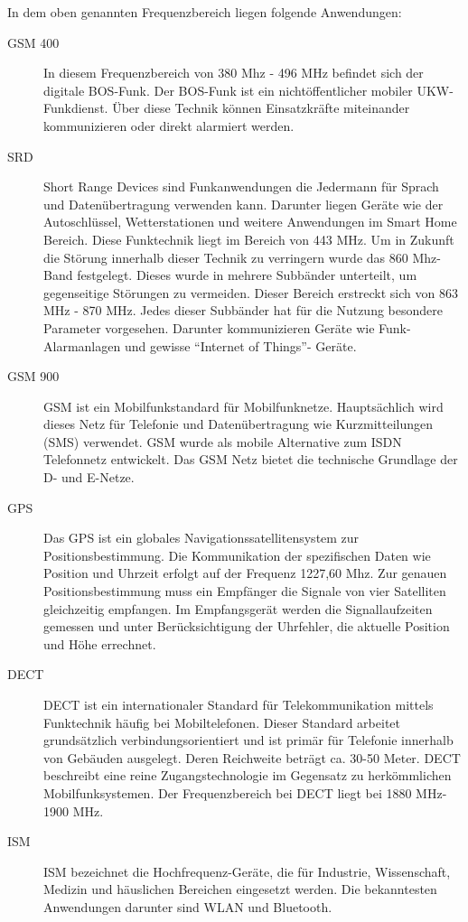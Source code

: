 In dem oben genannten Frequenzbereich liegen folgende Anwendungen:

\begin{description}
	\item [GSM 400]{In diesem Frequenzbereich von 380 Mhz - 496 MHz befindet sich der digitale \ac{BOS}-Funk. Der BOS-Funk ist ein nichtöffentlicher mobiler \ac{UKW}-Funkdienst. Über diese Technik können Einsatzkräfte miteinander kommunizieren oder direkt alarmiert werden.}
	\item [\ac{SRD}] {Short Range Devices sind Funkanwendungen die Jedermann für Sprach und Datenübertragung verwenden kann. Darunter liegen Geräte wie der Autoschlüssel, Wetterstationen und weitere Anwendungen im Smart Home Bereich. Diese Funktechnik liegt im Bereich von 443 MHz. Um in Zukunft die Störung innerhalb dieser Technik zu verringern  wurde das 860 Mhz-Band festgelegt. Dieses wurde in mehrere Subbänder unterteilt, um gegenseitige Störungen zu vermeiden. Dieser Bereich erstreckt sich von 863 MHz - 870 MHz. Jedes dieser Subbänder hat für die Nutzung besondere Parameter vorgesehen. Darunter kommunizieren Geräte wie Funk-Alarmanlagen und gewisse ``Internet of Things''- Geräte.}
	\item [\ac{GSM} 900] {GSM ist ein Mobilfunkstandard für Mobilfunknetze. Hauptsächlich wird dieses Netz für Telefonie und Datenübertragung wie Kurzmitteilungen (SMS) verwendet. GSM wurde als mobile Alternative zum ISDN Telefonnetz entwickelt. Das GSM Netz bietet die technische Grundlage der D- und E-Netze.  }
	\item [\ac{GPS}] {Das GPS ist ein globales Navigationssatellitensystem zur Positionsbestimmung. Die Kommunikation der spezifischen Daten wie Position und Uhrzeit erfolgt auf der Frequenz 1227,60 Mhz. Zur genauen Positionsbestimmung muss ein Empfänger die Signale von vier Satelliten gleichzeitig empfangen. Im Empfangsgerät werden die Signallaufzeiten gemessen und unter Berücksichtigung der Uhrfehler, die aktuelle Position und Höhe errechnet.}
	\item [\ac{DECT}] {DECT ist ein internationaler Standard für Telekommunikation mittels Funktechnik häufig bei Mobiltelefonen. Dieser Standard arbeitet grundsätzlich verbindungsorientiert und ist primär für Telefonie innerhalb von Gebäuden ausgelegt. Deren Reichweite beträgt ca. 30-50 Meter. DECT beschreibt eine reine Zugangstechnologie im Gegensatz zu herkömmlichen Mobilfunksystemen. Der Frequenzbereich bei DECT liegt bei 1880 MHz-1900 MHz.}
	\item [\ac{ISM}] {ISM bezeichnet die Hochfrequenz-Geräte, die für Industrie, Wissenschaft, Medizin und häuslichen Bereichen eingesetzt werden. Die bekanntesten Anwendungen darunter sind  WLAN und Bluetooth.}
\end{description}


